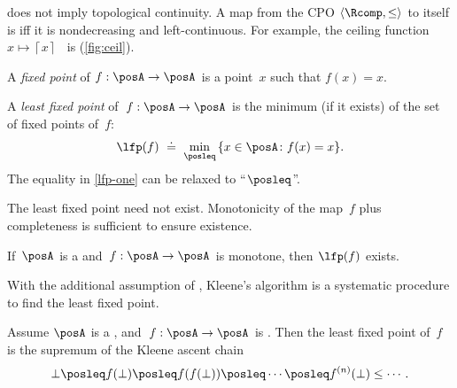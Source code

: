 \begin{remark}
\scottcontinuity does not imply topological continuity. A map from
the CPO $\langle\Rcomp,\leq\rangle$ to itself is \scottcontinuous
iff it is nondecreasing and left-continuous. For example, the ceiling
function $x\mapsto\left\lceil x\right\rceil $~ is \scottcontinuous
(\cref{fig:ceil}).
\end{remark}

\emph{}

A \emph{fixed point} of $f:\posA\rightarrow\posA$ is a point~$x$
such that $f(x)=x$.
\begin{definition}
A \emph{least fixed point} of~$f:\posA\rightarrow\posA$ is the minimum
(if it exists) of the set of fixed points of~$f$:
\begin{equation}
\lfp(f)\,\,\doteq\,\,\min_{\posleq}\,\{x\in\posA\colon f(x)=x\}.\label{eq:lfp-one}
\end{equation}
The equality in \eqref{lfp-one} can be relaxed to ``$\posleq$''.
\end{definition}
The least fixed point need not exist. Monotonicity of the map~$f$
plus completeness is sufficient to ensure existence.
\begin{lemma}
\label{lem:CPO-fix-point-2}If~$\posA$ is a \CPO and~$f:\posA\rightarrow\posA$
is monotone, then $\lfp(f)$ exists.
\end{lemma}


With the additional assumption of \scottcontinuity, Kleene's algorithm
is a systematic procedure to find the least fixed point.
\begin{lemma}
\label{lem:kleene-1}Assume $\posA$ is a \CPO, and~$f:\posA\rightarrow\posA$
is \scottcontinuous. Then the least fixed point of~$f$ is the supremum
of the Kleene ascent chain
\[
\bot\posleq f(\bot)\posleq f(f(\bot))\posleq\cdots\posleq f^{(n)}(\bot)\leq\cdots.
\]
\end{lemma}









